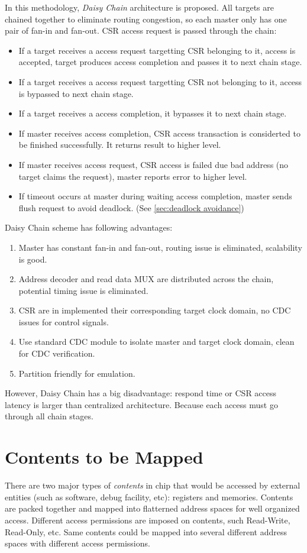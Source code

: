 \documentclass[10pt,oneside]{book}
\begin{document}
In this methodology, \emph{Daisy Chain} architecture is proposed. All \gls{target}s
are chained together to eliminate routing congestion, so each master only has one
pair of fan-in and fan-out. CSR access request is passed through the chain:
\begin{itemize}
\item If a \gls{target} receives a access request targetting CSR belonging to it, access is accepted, 
  \gls{target} produces access completion and passes it to next chain stage. 
\item If a \gls{target} receives a access request targetting CSR not belonging to it, 
  access is bypassed to next chain stage.
\item If a \gls{target} receives a access completion, it bypasses it to next chain stage. 
\item If \gls{master} receives access completion, CSR access transaction is considerted to be 
  finished successfully. It returns result to higher level. 
\item If \gls{master} receives access request, CSR access is failed due bad address
  (no target claims the request), \gls{master} reports error to higher level. 
\item If timeout occurs at \gls{master} during waiting access completion, \gls{master}
  sends flush request to avoid deadlock. (See \autoref{sec:deadlock avoidance})
\end{itemize}
Daisy Chain scheme has following advantages:
\begin{enumerate}
\item Master has constant fan-in and fan-out, routing issue is eliminated, scalability is good.
\item Address decoder and read data MUX are distributed across the chain, 
  potential timing issue is eliminated. 
\item CSR are in implemented their corresponding \gls{target} clock domain, 
  no CDC issues for control signals. 
\item Use standard CDC module to isolate \gls{master} and \gls{target} 
  clock domain, clean for CDC verification.
\item Partition friendly for emulation. 
\end{enumerate}
However, Daisy Chain has a big disadvantage: respond time or CSR access latency
is larger than centralized architecture. Because each access must go through all
chain stages.

\section{Contents to be Mapped}
There are two major types of \emph{contents} in chip that would be accessed
by external entities (such as software, debug facility, etc): registers and 
memories. Contents are packed together and mapped into flatterned 
address spaces for well organized access. Different access permissions are
imposed on contents, such Read-Write, Read-Only, etc. Same contents could be
mapped into several different address spaces with different access permissions. 
\end{document}
